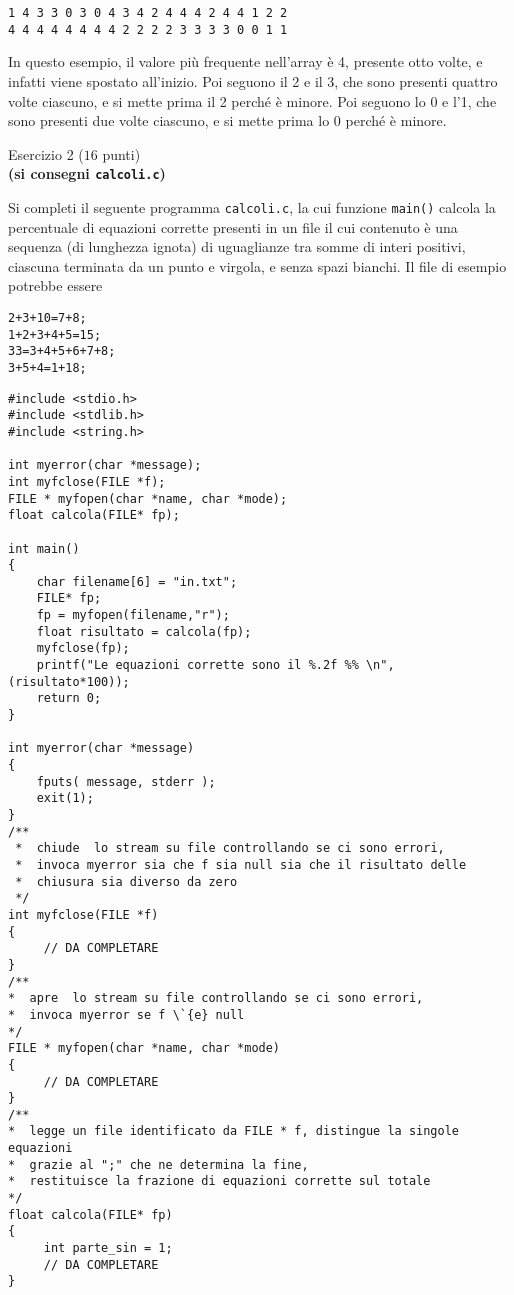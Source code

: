 \documentclass[12pt]{article}
\begin{document}
\begin{mdframed}[backgroundcolor=lightgrey] 
{\scriptsize\begin{verbatim}
1 4 3 3 0 3 0 4 3 4 2 4 4 4 2 4 4 1 2 2 
4 4 4 4 4 4 4 4 2 2 2 2 3 3 3 3 0 0 1 1
\end{verbatim}}
\end{mdframed}

\noindent
In questo esempio, il valore pi\`u frequente nell'array \`e 4, presente otto volte, e infatti
viene spostato all'inizio. Poi seguono il 2 e il 3, che sono presenti quattro volte ciascuno,
e si mette prima il 2 perch\'e \`e minore. Poi seguono lo 0 e l'1, che
sono presenti due volte ciascuno, e si mette prima lo 0 perch\'e \`e minore.
\newpage
\mbox{}\\
\begin{center}{\Large Esercizio 2} ($16$ punti)\\
  \textbf{(si consegni \texttt{calcoli.c})}\end{center}
Si completi il seguente programma \texttt{calcoli.c}, la cui funzione \texttt{main()} calcola la percentuale di equazioni corrette presenti in un file il cui contenuto \`{e} una sequenza (di lunghezza ignota) di uguaglianze tra somme di interi positivi, ciascuna terminata da un punto e virgola, e senza spazi bianchi. Il file di esempio potrebbe essere
\begin{verbatim}
2+3+10=7+8;
1+2+3+4+5=15;
33=3+4+5+6+7+8;
3+5+4=1+18;
\end{verbatim}
\begin{center}
\begin{lstlisting}[language=myC]
#include <stdio.h>
#include <stdlib.h>
#include <string.h>

int myerror(char *message);
int myfclose(FILE *f);
FILE * myfopen(char *name, char *mode);
float calcola(FILE* fp);

int main()
{
    char filename[6] = "in.txt";
    FILE* fp;
    fp = myfopen(filename,"r");
    float risultato = calcola(fp);
    myfclose(fp);
    printf("Le equazioni corrette sono il %.2f %% \n",(risultato*100));
    return 0;
}

int myerror(char *message)
{
    fputs( message, stderr );
    exit(1);
}
/**
 *  chiude  lo stream su file controllando se ci sono errori,
 *  invoca myerror sia che f sia null sia che il risultato delle
 *  chiusura sia diverso da zero
 */
int myfclose(FILE *f)
{
     // DA COMPLETARE
}
/**
*  apre  lo stream su file controllando se ci sono errori,
*  invoca myerror se f \`{e} null
*/
FILE * myfopen(char *name, char *mode)
{
     // DA COMPLETARE
}
/**
*  legge un file identificato da FILE * f, distingue la singole equazioni
*  grazie al ";" che ne determina la fine,
*  restituisce la frazione di equazioni corrette sul totale
*/
float calcola(FILE* fp)
{
     int parte_sin = 1;
     // DA COMPLETARE
}
\end{lstlisting}
\end{center}
\end{document}
